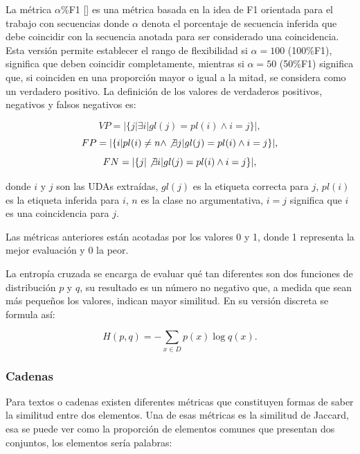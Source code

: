 La métrica $\alpha$\%F1 [\cite{persing2016end}] es una métrica basada en la idea de F1 orientada para el 
trabajo con secuencias donde $\alpha$ denota el porcentaje de secuencia inferida que debe coincidir con 
la secuencia anotada para ser considerado una coincidencia. Esta versión permite
establecer el rango de flexibilidad si $\alpha=100$ (100\%F1), significa que deben coincidir completamente, 
mientras si $\alpha = 50$ (50\%F1) significa que, si coinciden en una proporción mayor o igual a la mitad, 
se considera como un verdadero positivo. La definición de los valores de verdaderos positivos, negativos 
y falsos negativos es:

\begin{equation}
	VP = |\{ j | \exists i | gl(j) = pl(i) \land i = j \}|,
\end{equation}
\begin{equation}
	FP = |\{ i | pl(i) \neq n \land \not\exists j | gl(j) = pl(i) \land i = j \}|,
\end{equation}
\begin{equation}
	FN = |\{ j | \not\exists i | gl(j) = pl(i) \land i = j \}|,
\end{equation}

donde $i$ y $j$ son las UDAs extraídas, $gl(j)$ es la etiqueta correcta para $j$, $pl(i)$ es 
la etiqueta inferida para $i$, $n$ es la clase no argumentativa, $i = j$ significa que $i$ es 
una coincidencia para $j$.

Las métricas anteriores están acotadas por los valores 0 y 1, donde 1 representa la mejor evaluación y 0 la 
peor.

La entropía cruzada se encarga de evaluar qué tan diferentes son dos funciones de distribución $p$ y $q$, su 
resultado es un número no negativo que, a medida que sean más pequeños los valores, indican mayor similitud. 
En su versión discreta se formula así:

\begin{equation}
	H(p, q) = - \sum_{x \in D} p(x) \log q(x).
\end{equation}

\subsubsection{Cadenas}

Para textos o cadenas existen diferentes métricas que constituyen formas de saber la similitud 
entre dos elementos. Una de esas métricas es la similitud de Jaccard, esa se puede ver como 
la proporción de elementos comunes que presentan dos conjuntos, los elementos sería palabras:

